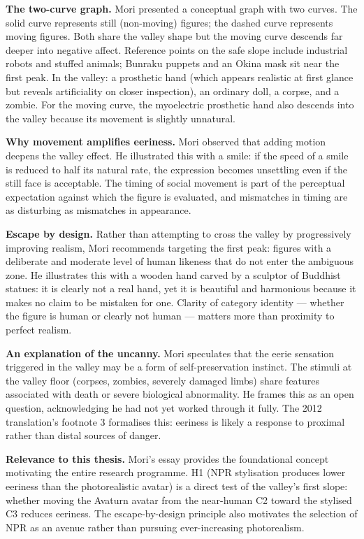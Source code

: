 \documentclass[11pt, a4paper]{article}
\begin{document}
\textbf{The two-curve graph.} Mori presented a conceptual graph with two curves. The solid curve represents still (non-moving) figures; the dashed curve represents moving figures. Both share the valley shape but the moving curve descends far deeper into negative affect. Reference points on the safe slope include industrial robots and stuffed animals; Bunraku puppets and an Okina mask sit near the first peak. In the valley: a prosthetic hand (which appears realistic at first glance but reveals artificiality on closer inspection), an ordinary doll, a corpse, and a zombie. For the moving curve, the myoelectric prosthetic hand also descends into the valley because its movement is slightly unnatural.

\textbf{Why movement amplifies eeriness.} Mori observed that adding motion deepens the valley effect. He illustrated this with a smile: if the speed of a smile is reduced to half its natural rate, the expression becomes unsettling even if the still face is acceptable. The timing of social movement is part of the perceptual expectation against which the figure is evaluated, and mismatches in timing are as disturbing as mismatches in appearance.

\textbf{Escape by design.} Rather than attempting to cross the valley by progressively improving realism, Mori recommends targeting the first peak: figures with a deliberate and moderate level of human likeness that do not enter the ambiguous zone. He illustrates this with a wooden hand carved by a sculptor of Buddhist statues: it is clearly not a real hand, yet it is beautiful and harmonious because it makes no claim to be mistaken for one. Clarity of category identity --- whether the figure is human or clearly not human --- matters more than proximity to perfect realism.

\textbf{An explanation of the uncanny.} Mori speculates that the eerie sensation triggered in the valley may be a form of self-preservation instinct. The stimuli at the valley floor (corpses, zombies, severely damaged limbs) share features associated with death or severe biological abnormality. He frames this as an open question, acknowledging he had not yet worked through it fully. The 2012 translation's footnote 3 formalises this: eeriness is likely a response to proximal rather than distal sources of danger.

\textbf{Relevance to this thesis.} Mori's essay provides the foundational concept motivating the entire research programme. H1 (NPR stylisation produces lower eeriness than the photorealistic avatar) is a direct test of the valley's first slope: whether moving the Avaturn avatar from the near-human C2 toward the stylised C3 reduces eeriness. The escape-by-design principle also motivates the selection of NPR as an avenue rather than pursuing ever-increasing photorealism.
\end{document}
